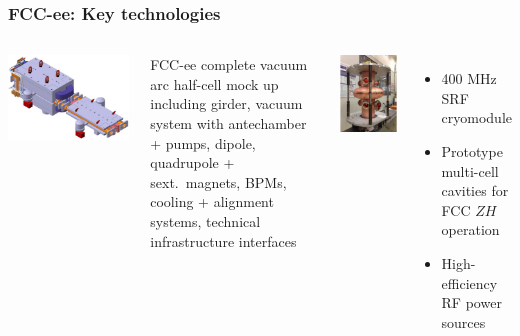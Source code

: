 \documentclass[aspectratio=169]{beamer}
\begin{document}
\begin{frame}
  \frametitle{FCC-ee: Key technologies}
  \begin{columns}[c]

    \begin{center}
      \includegraphics[width=0.6\linewidth]{figures/vacuumArc.png}\\
    \end{center}

    FCC-ee complete vacuum arc half-cell mock up\\[1ex]
    \small{%
    including girder, vacuum system with antechamber + pumps,
    dipole, quadrupole + sext.\ magnets, BPMs, cooling + alignment
    systems, technical infrastructure interfaces}


    \begin{center}
      \includegraphics[width=0.35\linewidth]{figures/srfCavities.png}\\
    \end{center}

    \begin{itemize}
      \item 400 MHz SRF cryomodule
      \item Prototype multi-cell cavities for FCC $ZH$ operation
      \item High-efficiency RF power sources
    \end{itemize}
  \end{columns}
\end{frame}
\end{document}
